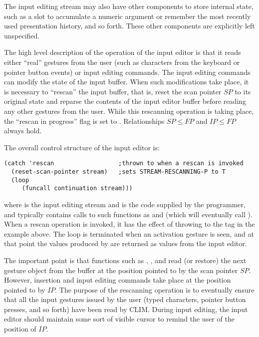 The input editing stream may also have other components to store internal state,
such as a slot to accumulate a numeric argument or remember the most recently
used presentation history, and so forth.  These other components are explicitly
left unspecified.

The high level description of the operation of the input editor is that it reads
either ``real'' gestures from the user (such as characters from the keyboard or
pointer button events) or input editing commands.  The input editing commands
can modify the state of the input buffer.  When such modifications take place,
it is necessary to ``rescan'' the input buffer, that is, reset the scan pointer
$SP$ to its original state and reparse the contents of the input editor buffer
before reading any other gestures from the user.  While this rescanning
operation is taking place, the ``rescan in progress'' flag is set to
.  Relationships $SP \leq FP$ and $IP \leq FP$ always hold.

The overall control structure of the input editor is:

\begin{verbatim}
(catch 'rescan                  ;thrown to when a rescan is invoked
  (reset-scan-pointer stream)   ;sets STREAM-RESCANNING-P to T
  (loop
     (funcall continuation stream)))
\end{verbatim}

where  is the input editing stream and  is the
code supplied by the programmer, and typically contains calls to such functions
as  and  (which will eventually call
).  When a rescan operation is invoked, it has the
effect of throwing to the  tag in the example above.  The loop is
terminated when an activation gesture is seen, and at that point the values
produced by  are returned as values from the input editor.

The important point is that functions such as , ,
and  read (or restore) the next gesture object from the
buffer at the position pointed to by the scan pointer $SP$.  However, insertion
and input editing commands take place at the position pointed to by $IP$.  The
purpose of the rescanning operation is to eventually ensure that all the input
gestures issued by the user (typed characters, pointer button presses, and so
forth) have been read by CLIM.  During input editing, the input editor should
maintain some sort of visible cursor to remind the user of the position of $IP$.

